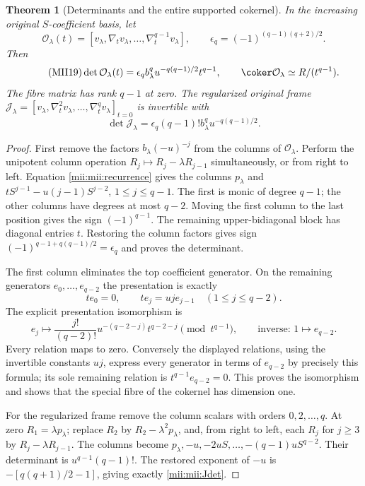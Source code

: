 \documentclass[11pt,a4paper]{article}
\newtheorem{theorem}{Theorem}[section]
\begin{document}
\begin{theorem}[Determinants and the entire supported cokernel]
In the increasing original $S$-coefficient basis, let
\[
 \mathcal O_\lambda(t)=[v_\lambda,\nabla_t v_\lambda,
                  \ldots,\nabla_t^{q-1}v_\lambda],
 \qquad\epsilon_q=(-1)^{(q-1)(q+2)/2}.
\]
Then
\begin{equation}\tag{MII19}\label{mii:mii:Odet}
 \det\mathcal O_\lambda(t)
   =\epsilon_q b_\lambda^q u^{-q(q-1)/2}t^{q-1},
 \qquad\coker\mathcal O_\lambda\simeq R/(t^{q-1}).
\end{equation}
The fibre matrix has rank $q-1$ at zero. The regularized original
frame
$\mathcal J_\lambda=[v_\lambda,\nabla_t^2v_\lambda,
\ldots,\nabla_t^qv_\lambda]_{t=0}$ is invertible with
\begin{equation}\tag{MII20}\label{mii:mii:Jdet}
 \det\mathcal J_\lambda
    =\epsilon_q(q-1)!b_\lambda^q u^{-q(q-1)/2}.
\end{equation}
\end{theorem}
\begin{proof}
First remove the factors $b_\lambda(-u)^{-j}$ from the columns
of $\mathcal O_\lambda$. Perform the unipotent column operation
$R_j\mapsto R_j-\lambda R_{j-1}$ simultaneously, or from right
to left. Equation \eqref{mii:mii:recurrence} gives the columns
$p_\lambda$ and $tS^{j-1}-u(j-1)S^{j-2}$, $1\le j\le q-1$.
The first is monic of degree $q-1$; the other columns have degrees
at most $q-2$. Moving the first column to the last position gives
the sign $(-1)^{q-1}$. The remaining upper-bidiagonal block has
diagonal entries $t$. Restoring the column factors gives sign
$(-1)^{q-1+q(q-1)/2}=\epsilon_q$ and proves the determinant.

The first column eliminates the top coefficient generator. On the
remaining generators $e_0,\ldots,e_{q-2}$ the presentation is exactly
\[
 te_0=0,\qquad te_j=u j e_{j-1}\quad(1\le j\le q-2).
\]
The explicit presentation isomorphism is
\begin{equation}\tag{MII21}\label{mii:mii:cokeriso}
 e_j\longmapsto
 \frac{j!}{(q-2)!}u^{-(q-2-j)}t^{q-2-j}\pmod{t^{q-1}},
 \qquad\text{inverse: }1\longmapsto e_{q-2}.
\end{equation}
Every relation maps to zero. Conversely the displayed relations,
using the invertible constants $uj$, express every generator in
terms of $e_{q-2}$ by precisely this formula; its sole remaining
relation is $t^{q-1}e_{q-2}=0$. This proves the isomorphism and
shows that the special fibre of the cokernel has dimension one.

For the regularized frame remove the column scalars with orders
$0,2,\ldots,q$. At zero $R_1=\lambda p_\lambda$; replace
$R_2$ by $R_2-\lambda^2p_\lambda$, and, from right to left, each
$R_j$ for $j\ge3$ by $R_j-\lambda R_{j-1}$. The columns become
$p_\lambda,-u,-2uS,\ldots,-(q-1)uS^{q-2}$. Their determinant
is $u^{q-1}(q-1)!$. The restored exponent of $-u$ is
$-[q(q+1)/2-1]$, giving exactly \eqref{mii:mii:Jdet}.
\end{proof}
\end{document}
